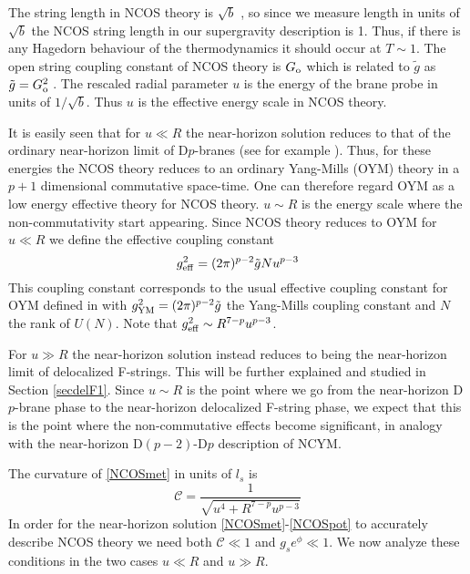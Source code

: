 \documentclass[a4paper,twoside,titlepage,12pt]{article}
\begin{document}
The string length in NCOS theory 
is $\sqrt{b}$ \cite{Seiberg:2000ms,Gopakumar:2000na}, so since 
we measure length
in units of $\sqrt{b}$ the NCOS string length in our supergravity 
description is 1.
Thus, if there is any Hagedorn behaviour of the thermodynamics
it should occur at $T \sim 1$.
The open string coupling constant of NCOS theory is \( G_{\rm o} \) which is related
to \( \tilde{g} \) as \( \tilde{g} = G_{\rm o}^2 \) 
\cite{Gopakumar:2000na}.
The rescaled radial parameter $u$ is the energy of the
brane probe in units of \( 1/\sqrt{b} \). Thus $u$ is the 
effective energy scale in NCOS theory.


It is easily seen that for \( u \ll R \) the near-horizon solution reduces
to that of the ordinary near-horizon limit of D$p$-branes
(see for example \cite{Itzhaki:1998dd}). Thus, for these 
energies the NCOS theory reduces to an ordinary Yang-Mills (OYM) theory
in a $p+1$ dimensional commutative space-time.
One can therefore regard OYM as a low energy effective theory for NCOS theory.
$u \sim R$ is the energy scale where
the non-commutativity start appearing.
Since NCOS theory reduces to OYM for \( u \ll R \) 
we define the effective coupling constant
%
\begin{equation}
g_{\mathrm{eff}}^2 = (2\pi)^{p-2} \tilde{g} N u^{p-3} 
\end{equation}
%
This coupling constant corresponds to the usual effective coupling 
constant for OYM defined in \cite{Itzhaki:1998dd}
with $g_{\mathrm{YM}}^2 = (2\pi)^{p-2} \tilde{g} $ the Yang-Mills coupling
constant and $N$ the rank of $U(N)$. 
Note that \( g_{\mathrm{eff}}^2 \sim R^{7-p} u^{p-3} \).

For \( u \gg R \) the near-horizon solution instead reduces to 
being the near-horizon limit of delocalized F-strings. This
will be further explained and studied in Section \ref{secdelF1}.
Since \( u \sim R \) is the point where we go from the 
near-horizon D$p$-brane phase to the near-horizon delocalized F-string phase,
we expect that this is the point where the non-commutative effects
become significant, in analogy with the near-horizon D$(p-2)$-D$p$ 
description of NCYM.

The curvature of \eqref{NCOSmet} in units of \( l_s \) is
%
\begin{equation}
\label{curv}
\mathcal{C} = \frac{1}{\sqrt{u^4 + R^{7-p} u^{p-3} }} 
\end{equation}
%
In order for the near-horizon 
solution \eqref{NCOSmet}-\eqref{NCOSpot}
to accurately describe NCOS theory we need both \( \mathcal{C} \ll 1 \)
and \( g_s e^{\phi} \ll 1 \).
We now analyze these conditions in the two cases \( u \ll R \)
and \( u \gg R \).
\end{document}

